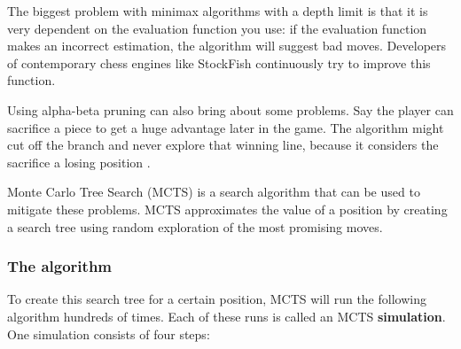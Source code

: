 \documentclass{article}
\begin{document}
The biggest problem with minimax algorithms with a depth limit is that it is very dependent
on the evaluation function you use: if the evaluation function makes an incorrect estimation, 
the algorithm will suggest bad moves. Developers of contemporary chess engines like StockFish continuously
try to improve this function. 

Using alpha-beta pruning can also bring about some problems. Say the player can sacrifice a piece
to get a huge advantage later in the game. The algorithm might cut off the branch and never explore that winning line, 
because it considers the sacrifice a losing position \cite{MinimaxMonteCarlo}. 

Monte Carlo Tree Search (MCTS) \cite{MonteCarloTree2022} is a search algorithm that can be used to mitigate these problems.
MCTS approximates the value of a position by creating a search tree using random exploration of the most promising moves.

\subsubsection{The algorithm}

To create this search tree for a certain position, MCTS will run the following algorithm hundreds of times. 
Each of these runs is called an MCTS \textbf{simulation}. One simulation consists of four steps:
\end{document}
